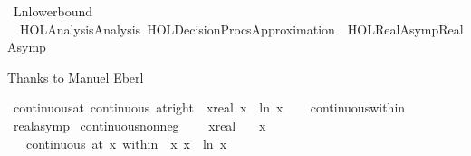 %
\begin{isabellebody}%
%
%
\isadelimdocument
%
\endisadelimdocument
%
\isatagdocument
%
\isamarkuptrue%
%
\endisatagdocument
{\isafolddocument}%
%
\isadelimdocument
%
\endisadelimdocument
%
\isadelimtheory
%
\endisadelimtheory
%
\isatagtheory
{}\isamarkupfalse%
\ Ln{\isacharunderscore}{\kern0pt}lower{\isacharunderscore}{\kern0pt}bound\ \isanewline
\ \ {\isachardoublequoteopen}HOL{\isacharminus}{\kern0pt}Analysis{\isachardot}{\kern0pt}Analysis{\isachardoublequoteclose}\ {\isachardoublequoteopen}HOL{\isacharminus}{\kern0pt}Decision{\isacharunderscore}{\kern0pt}Procs{\isachardot}{\kern0pt}Approximation{\isachardoublequoteclose}\ \ {\isachardoublequoteopen}HOL{\isacharminus}{\kern0pt}Real{\isacharunderscore}{\kern0pt}Asymp{\isachardot}{\kern0pt}Real{\isacharunderscore}{\kern0pt}Asymp{\isachardoublequoteclose}\ \isanewline
\ \ \ \isanewline
{}%
\endisatagtheory
{\isafoldtheory}%
%
\isadelimtheory
%
\endisadelimtheory
%
\begin{isamarkuptext}%
Thanks to Manuel Eberl%
\end{isamarkuptext}\isamarkuptrue%
\isamarkupfalse%
\ continuous{\isacharunderscore}{\kern0pt}at{\isacharunderscore}{\kern0pt}{}{\isacharcolon}{\kern0pt}\ {\isachardoublequoteopen}continuous\ {\isacharparenleft}{\kern0pt}at{\isacharunderscore}{\kern0pt}right\ {}{\isacharparenright}{\kern0pt}\ {\isacharparenleft}{\kern0pt}{\isasymlambda}x{\isacharcolon}{\kern0pt}{\isacharcolon}{\kern0pt}real{\isachardot}{\kern0pt}\ x\ {\isacharasterisk}{\kern0pt}\ ln\ x{\isacharparenright}{\kern0pt}{\isachardoublequoteclose}\isanewline
%
\isadelimproof
\ \ %
\endisadelimproof
%
\isatagproof
{}\isamarkupfalse%
\ continuous{\isacharunderscore}{\kern0pt}within\ \isamarkupfalse%
\ real{\isacharunderscore}{\kern0pt}asymp%
\endisatagproof
{\isafoldproof}%
%
\isadelimproof
\isanewline
%
\endisadelimproof
\isanewline
{}\isamarkupfalse%
\ continuous{\isacharunderscore}{\kern0pt}nonneg{\isacharcolon}{\kern0pt}\ \isanewline
\ \ \ x{\isacharcolon}{\kern0pt}{\isacharcolon}{\kern0pt}real\isanewline
\ \ \ {\isachardoublequoteopen}x\ {\isasymge}\ {}{\isachardoublequoteclose}\isanewline
\ \ \ {\isachardoublequoteopen}continuous\ {\isacharparenleft}{\kern0pt}at\ x\ within\ {\isacharbraceleft}{\kern0pt}{}{\isachardot}{\kern0pt}{\isachardot}{\kern0pt}{\isacharbraceright}{\kern0pt}{\isacharparenright}{\kern0pt}\ {\isacharparenleft}{\kern0pt}{\isasymlambda}x{\isachardot}{\kern0pt}\ x\ {\isacharasterisk}{\kern0pt}\ ln\ x{\isacharparenright}{\kern0pt}{\isachardoublequoteclose}\isanewline

\end{isabellebody}

